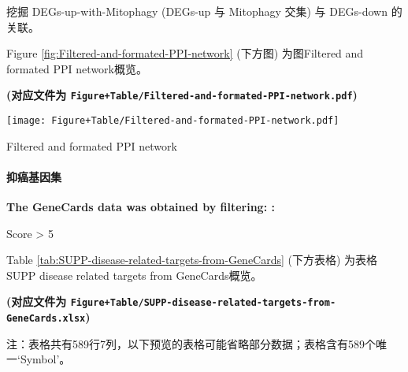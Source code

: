 \documentclass[
]{article}
\begin{document}
挖掘 DEGs-up-with-Mitophagy (DEGs-up 与 Mitophagy 交集) 与 DEGs-down 的关联。

Figure \ref{fig:Filtered-and-formated-PPI-network} (下方图) 为图Filtered and formated PPI network概览。

\textbf{(对应文件为 \texttt{Figure+Table/Filtered-and-formated-PPI-network.pdf})}

\def\@captype{figure}
\begin{center}
\texttt{[image: Figure+Table/Filtered-and-formated-PPI-network.pdf]}
\caption{Filtered and formated PPI network}\label{fig:Filtered-and-formated-PPI-network}
\end{center}

\hypertarget{ux6291ux764cux57faux56e0ux96c6}{%
\paragraph{抑癌基因集}\label{ux6291ux764cux57faux56e0ux96c6}}

\begin{center}\begin{tcolorbox}[colback=gray!10, colframe=gray!50, width=0.9\linewidth, arc=1mm, boxrule=0.5pt]
\textbf{
The GeneCards data was obtained by filtering:
:}

\vspace{0.5em}

    Score > 5

\vspace{2em}
\end{tcolorbox}
\end{center}

Table \ref{tab:SUPP-disease-related-targets-from-GeneCards} (下方表格) 为表格SUPP disease related targets from GeneCards概览。

\textbf{(对应文件为 \texttt{Figure+Table/SUPP-disease-related-targets-from-GeneCards.xlsx})}

\begin{center}\begin{tcolorbox}[colback=gray!10, colframe=gray!50, width=0.9\linewidth, arc=1mm, boxrule=0.5pt]注：表格共有589行7列，以下预览的表格可能省略部分数据；表格含有589个唯一`Symbol'。
\end{tcolorbox}
\end{center}
\end{document}
